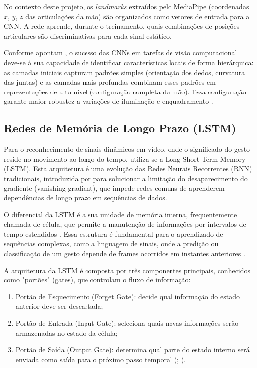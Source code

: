\documentclass[
    12pt,                %
    openright,           %
    oneside,             %
    a4paper,             %
    english,             %
    brazil               %
]{abntex2}
\begin{document}
No contexto deste projeto, os \textit{landmarks} extraídos pelo MediaPipe (coordenadas $x$, $y$, $z$ das articulações da mão) são organizados como vetores de entrada para a CNN. A rede aprende, durante o treinamento, quais combinações de posições articulares são discriminativas para cada sinal estático. 

Conforme apontam , o sucesso das CNNs em tarefas de visão computacional deve-se à sua capacidade de identificar características locais de forma hierárquica: as camadas iniciais capturam padrões simples (orientação dos dedos, curvatura das juntas) e as camadas mais profundas combinam esses padrões em representações de alto nível (configuração completa da mão). Essa configuração garante maior robustez a variações de iluminação e enquadramento \cite{Furtado2019}.

\subsection{Redes de Memória de Longo Prazo (LSTM)}

Para o reconhecimento de sinais dinâmicos em vídeo, onde o significado do gesto reside no movimento ao longo do tempo, utiliza-se a Long Short-Term Memory (LSTM). Esta arquitetura é uma evolução das Redes Neurais Recorrentes (RNN) tradicionais, introduzida por  para solucionar a limitação do desaparecimento do gradiente (vanishing gradient), que impede redes comuns de aprenderem dependências de longo prazo em sequências de dados.

O diferencial da LSTM é a sua unidade de memória interna, frequentemente chamada de célula, que permite a manutenção de informações por intervalos de tempo estendidos \cite{Hochreiter1997}. Essa estrutura é fundamental para o aprendizado de sequências complexas, como a linguagem de sinais, onde a predição ou classificação de um gesto depende de frames ocorridos em instantes anteriores \cite{Bayer2009}.

A arquitetura da LSTM é composta por três componentes principais, conhecidos como "portões" (gates), que controlam o fluxo de informação:

\begin{enumerate}
  \item Portão de Esquecimento (Forget Gate): decide qual informação do estado anterior deve ser descartada;
  \item Portão de Entrada (Input Gate): seleciona quais novas informações serão armazenadas no estado da célula;
  \item Portão de Saída (Output Gate): determina qual parte do estado interno será enviada como saída para o próximo passo temporal (\cite{Contarini2020}; \cite{Almeida2019}).
\end{enumerate}
\end{document}
